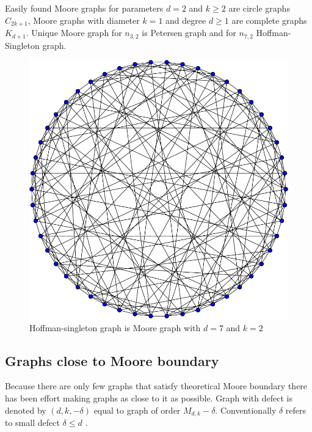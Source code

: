 \documentclass[a4paper,11pt,twoside]{report}%
\begin{document}
Easily found Moore graphs for parameters $d=2$ and $k \geq 2$ are circle graphs $C_{2k+1}$, Moore graphs with diameter $k = 1$ and degree $d \geq 1$ are complete graphs $K_{d+1}$. Unique Moore graph for $n_{3,2}$ is Petersen graph and for $n_{7,2}$ Hoffman-Singleton graph.

\begin{figure}[!ht]
	\centering
	\includegraphics[scale=0.33]{Hoffman-Singleton_graph.png}
	\caption{Hoffman-singleton graph is Moore graph with $d=7$ and $k=2$ }
\end{figure}



\subsection{Graphs close to Moore boundary}
Because there are only few graphs that satisfy theoretical Moore boundary there has been effort making graphs as close to it as possible. Graph with defect is denoted by $(d,k,-\delta)$ equal to graph of order $M_{d,k}-\delta$. Conventionally $\delta$ refers to small defect $\delta \leq d$ . 
\end{document}
